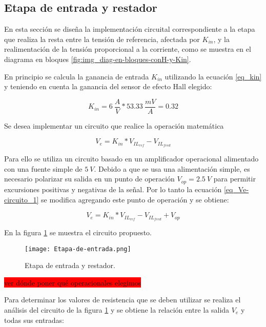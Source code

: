 \subsection{Etapa de entrada y restador}

En esta sección se diseña la implementación circuital correspondiente a la etapa que realiza la resta entre la tensión de referencia, afectada por $K_{in}$, y la realimentación de la tensión proporcional a la corriente, como se muestra en el diagrama en bloques \ref{fig:img_diag-en-bloques-conH-y-Kin}.



En principio se calcula la ganancia de entrada $K_{in}$ utilizando la ecuación \ref{eq_kin} y teniendo en cuenta la ganancia del sensor de efecto Hall elegido:

\begin{equation}
	K_{in}=6\:\frac{A}{V}*53.33\:\frac{mV}{A}=0.32
\end{equation}

Se desea implementar un circuito que realice la operación matemática 

\begin{equation}\label{eq_Ve-circuito_1}
	V_e=K_{in}*V_{IL_{ref}} - V_{IL_{feed}}
\end{equation}

Para ello se utiliza un circuito basado en un amplificador operacional alimentado con una fuente simple de $5\:V$. Debido a que se usa una alimentación simple, es necesario polarizar su salida en un punto de operación $V_{op}=2.5\:V$ para permitir excursiones positivas y negativas de la señal. Por lo tanto la ecuación \ref{eq_Ve-circuito_1} se modifica agregando este punto de operación y se obtiene:

\begin{equation}\label{eq_Ve-circuito}
V_e=K_{in}*V_{IL_{ref}} - V_{IL_{feed}} + V_{op}
\end{equation}

En la figura \ref{fig:img_etapa-de-entrada} se muestra el circuito propuesto. 


\begin{figure}[H]
	\centering
	\texttt{[image: Etapa-de-entrada.png]}
	\caption{Etapa de entrada y restador.}
	\label{fig:img_etapa-de-entrada}
\end{figure}

\colorbox{red}{ver dónde poner qué operacionales elegimos}

Para determinar los valores de resistencia que se deben utilizar se realiza el análisis del circuito de la figura \ref{fig:img_etapa-de-entrada} y se obtiene la relación entre la salida $V_e$ y todas sus entradas:

